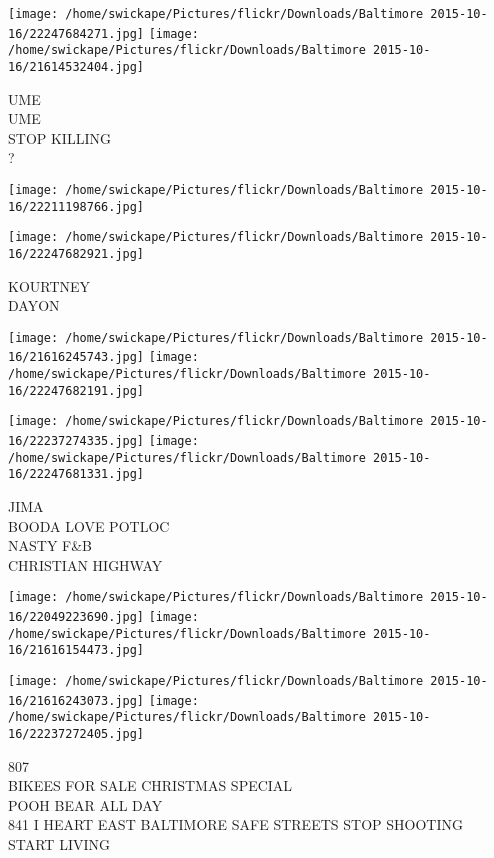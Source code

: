 \documentclass[10pt,letterpaper]{article}
\begin{document}
\texttt{[image: /home/swickape/Pictures/flickr/Downloads/Baltimore 2015-10-16/22247684271.jpg]}
\texttt{[image: /home/swickape/Pictures/flickr/Downloads/Baltimore 2015-10-16/21614532404.jpg]}

UME\\
UME\\
STOP KILLING\\
?\\
\pagebreak

\texttt{[image: /home/swickape/Pictures/flickr/Downloads/Baltimore 2015-10-16/22211198766.jpg]}

\vspace{0.25in}
\texttt{[image: /home/swickape/Pictures/flickr/Downloads/Baltimore 2015-10-16/22247682921.jpg]}

KOURTNEY\\
DAYON\\
\pagebreak

\texttt{[image: /home/swickape/Pictures/flickr/Downloads/Baltimore 2015-10-16/21616245743.jpg]}
\texttt{[image: /home/swickape/Pictures/flickr/Downloads/Baltimore 2015-10-16/22247682191.jpg]}

\texttt{[image: /home/swickape/Pictures/flickr/Downloads/Baltimore 2015-10-16/22237274335.jpg]}
\texttt{[image: /home/swickape/Pictures/flickr/Downloads/Baltimore 2015-10-16/22247681331.jpg]}

JIMA\\
BOODA LOVE POTLOC\\
NASTY F\&B\\
CHRISTIAN HIGHWAY\\
\pagebreak

\texttt{[image: /home/swickape/Pictures/flickr/Downloads/Baltimore 2015-10-16/22049223690.jpg]}
\texttt{[image: /home/swickape/Pictures/flickr/Downloads/Baltimore 2015-10-16/21616154473.jpg]}

\texttt{[image: /home/swickape/Pictures/flickr/Downloads/Baltimore 2015-10-16/21616243073.jpg]}
\texttt{[image: /home/swickape/Pictures/flickr/Downloads/Baltimore 2015-10-16/22237272405.jpg]}

807\\
BIKEES FOR SALE CHRISTMAS SPECIAL\\
POOH BEAR ALL DAY\\
841 I HEART EAST BALTIMORE SAFE STREETS STOP SHOOTING START LIVING\\
\pagebreak
\end{document}
